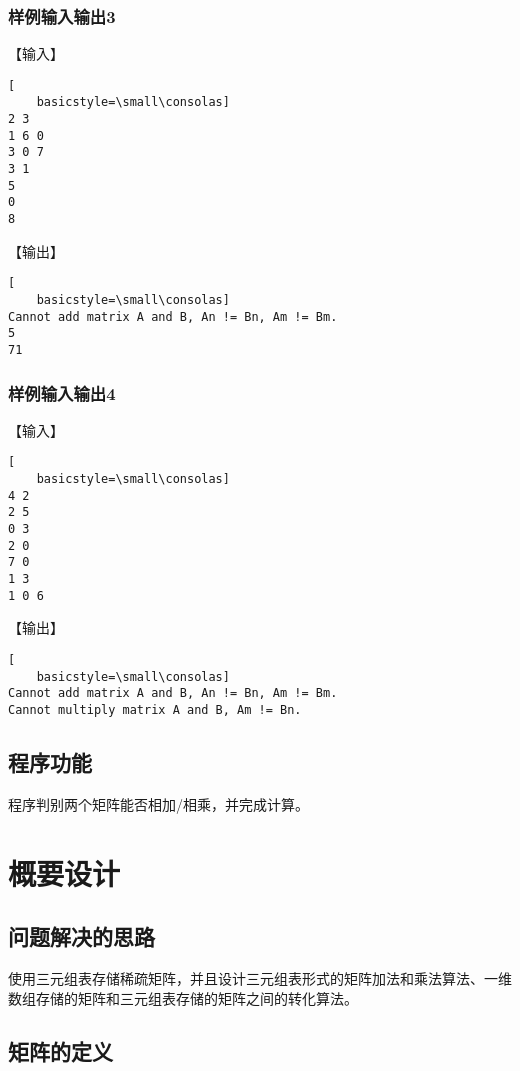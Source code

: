 \documentclass{article}
\begin{document}
\subsubsection{样例输入输出3}

【输入】

\begin{lstlisting}[
    basicstyle=\small\consolas]
2 3
1 6 0
3 0 7
3 1
5
0
8
\end{lstlisting}

【输出】

\begin{lstlisting}[
    basicstyle=\small\consolas]
Cannot add matrix A and B, An != Bn, Am != Bm.
5 
71 
\end{lstlisting}

\subsubsection{样例输入输出4}

【输入】

\begin{lstlisting}[
    basicstyle=\small\consolas]
4 2
2 5
0 3
2 0
7 0
1 3
1 0 6
\end{lstlisting}

【输出】

\begin{lstlisting}[
    basicstyle=\small\consolas]
Cannot add matrix A and B, An != Bn, Am != Bm.
Cannot multiply matrix A and B, Am != Bn.
\end{lstlisting}

\subsection{程序功能}

程序判别两个矩阵能否相加/相乘，并完成计算。

\section{概要设计}

\subsection{问题解决的思路}

使用三元组表存储稀疏矩阵，并且设计三元组表形式的矩阵加法和乘法算法、一维数组存储的矩阵和三元组表存储的矩阵之间的转化算法。

\subsection{矩阵的定义}
\end{document}
